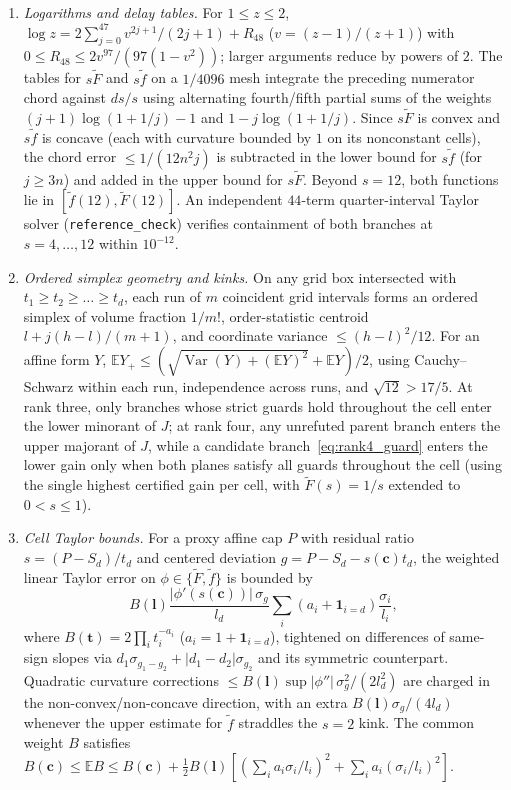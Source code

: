 \documentclass[11pt,reqno]{amsart}
\theoremstyle{remark}
\newcommand{\ind}{\mathbf{1}}
\newcommand{\normF}{\widetilde{F}}
\newcommand{\normf}{\widetilde{f}}
\numberwithin{equation}{section}
\begin{document}
\begin{enumerate}
\item \emph{Logarithms and delay tables.} For $1 \le z \le 2$, $\log z = 2\sum_{j=0}^{47} v^{2j+1}/(2j+1) + R_{48}$ ($v=(z-1)/(z+1)$) with $0 \le R_{48} \le 2v^{97}/(97(1-v^2))$; larger arguments reduce by powers of $2$. The tables for $s\normF$ and $s\normf$ on a $1/4096$ mesh integrate the preceding numerator chord against $ds/s$ using alternating fourth/fifth partial sums of the weights $(j+1)\log(1+1/j)-1$ and $1-j\log(1+1/j)$. Since $s\normF$ is convex and $s\normf$ is concave (each with curvature bounded by $1$ on its nonconstant cells), the chord error $\le 1/(12n^2 j)$ is subtracted in the lower bound for $s\normf$ (for $j \ge 3n$) and added in the upper bound for $s\normF$. Beyond $s = 12$, both functions lie in $[\normf(12), \normF(12)]$. An independent $44$-term quarter-interval Taylor solver (\texttt{reference\_check}) verifies containment of both branches at $s = 4, \dots, 12$ within $10^{-12}$.

\item \emph{Ordered simplex geometry and kinks.} On any grid box intersected with $t_1 \ge t_2 \ge \dots \ge t_d$, each run of $m$ coincident grid intervals forms an ordered simplex of volume fraction $1/m!$, order-statistic centroid $l + j(h-l)/(m+1)$, and coordinate variance $\le (h-l)^2/12$. For an affine form $Y$, $\mathbb{E}Y_+ \le (\sqrt{\operatorname{Var}(Y) + (\mathbb{E}Y)^2} + \mathbb{E}Y)/2$, using Cauchy--Schwarz within each run, independence across runs, and $\sqrt{12} > 17/5$. At rank three, only branches whose strict guards hold throughout the cell enter the lower minorant of $J$; at rank four, any unrefuted parent branch enters the upper majorant of $J$, while a candidate branch~\eqref{eq:rank4_guard} enters the lower gain only when both planes satisfy all guards throughout the cell (using the single highest certified gain per cell, with $\normF(s) = 1/s$ extended to $0 < s \le 1$).

\item \emph{Cell Taylor bounds.} For a proxy affine cap $P$ with residual ratio $s = (P-S_d)/t_d$ and centered deviation $g = P - S_d - s(\mathbf{c})t_d$, the weighted linear Taylor error on $\phi \in \{\normF, \normf\}$ is bounded by
\[
B(\mathbf{l})\frac{|\phi'(s(\mathbf{c}))|\,\sigma_g}{l_d}\sum_i (a_i + \ind_{i=d})\frac{\sigma_i}{l_i},
\]
where $B(\mathbf{t}) = 2\prod_i t_i^{-a_i}$ ($a_i = 1 + \ind_{i=d}$), tightened on differences of same-sign slopes via $d_1\sigma_{g_1-g_2} + |d_1-d_2|\sigma_{g_2}$ and its symmetric counterpart. Quadratic curvature corrections $\le B(\mathbf{l})\sup|\phi''|\,\sigma_g^2/(2l_d^2)$ are charged in the non-convex/non-concave direction, with an extra $B(\mathbf{l})\sigma_g/(4l_d)$ whenever the upper estimate for $\normf$ straddles the $s=2$ kink. The common weight $B$ satisfies $B(\mathbf{c}) \le \mathbb{E}B \le B(\mathbf{c}) + \frac{1}{2}B(\mathbf{l})[(\sum_i a_i\sigma_i/l_i)^2 + \sum_i a_i(\sigma_i/l_i)^2]$.
\end{enumerate}
\end{document}
